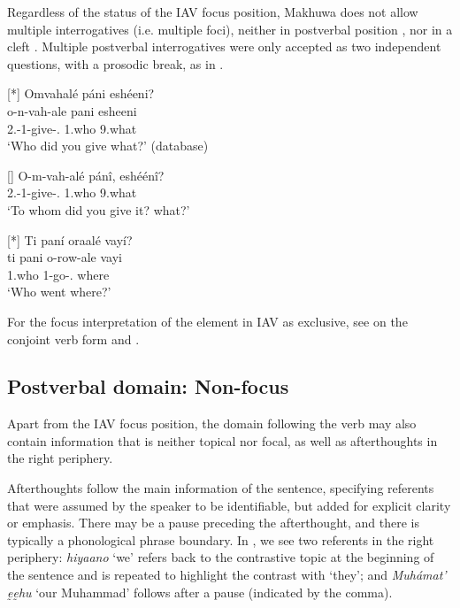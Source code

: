 \documentclass[output=paper]{langscibook}
\begin{document}
\z

Regardless of the status of the IAV focus position, Makhuwa does not allow multiple interrogatives (i.e. multiple foci), neither in postverbal position , nor in a cleft . Multiple postverbal interrogatives were only accepted as two independent questions, with a prosodic break, as in .

\ea
\label{bkm:Ref114753872}
\ea
[*]{
\label{bkm:Ref114753872:a}
Omvahalé páni eshéeni?\\
\gll
o-n-vah-ale  pani  esheeni\\
2\SG{}.\SM{}-1\OM{}-give-\PFV{}.\CJ{}  1.who  9.what\\
\glt
‘Who did you give what?’ (database)\\
}

\ex
[]{
\label{bkm:Ref114753872:b}
\gll
O-m-vah-alé  pánî,  eshéénî?\\
2\SG{}.\SM{}-1\OM{}-give-\PFV{}.\CJ{}  1.who  9.what\\
\glt
‘To whom did you give it? what?’ \citep[250]{vanderWal2009a}\\
}

\z
\z

\ea
[*]{
\label{bkm:Ref114753882}
Ti paní oraalé vayí?\\
\gll
ti  pani  o-row-ale  vayi\\
\COP{}  1.who  1{}-go-\PFV{}.\REL{}  where\\
\glt
‘Who went where?’\\
}


\z

For the focus interpretation of the element in IAV as exclusive, see  on the conjoint verb form and \citet{vanderWal2011}.

\subsection{Postverbal domain: Non-focus}
\label{bkm:Ref109481548}
Apart from the IAV focus position, the domain following the verb may also contain information that is neither topical nor focal, as well as afterthoughts in the right periphery.

Afterthoughts follow the main information of the sentence, specifying referents that were assumed by the speaker to be identifiable, but added for explicit clarity or emphasis. There may be a pause preceding the afterthought, and there is typically a phonological phrase boundary. In , we see two referents in the right periphery: \textit{hiyaano} ‘we’ refers back to the contrastive topic at the beginning of the sentence and is repeated to highlight the contrast with ‘they’; and \textit{Muhámat’ ḛḛhu} ‘our Muhammad’ follows after a pause (indicated by the comma). 
\end{document}
